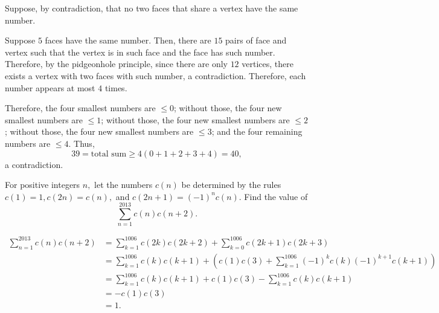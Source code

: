 \begin{sol}
	Suppose, by contradiction, that no two faces that share a vertex have the same number. 

	Suppose \(5\) faces have the same number. Then, there are \(15\) pairs of face and vertex such that the vertex is in such face and the face has such number. Therefore, by the pidgeonhole principle, since there are only \(12\) vertices, there exists a vertex with two faces with such number, a contradiction. Therefore, each number appears at most \(4\) times.

	Therefore, the four smallest numbers are \(\leq 0\);
	without those, the four new smallest numbers are \(\leq 1\);
	without those, the four new smallest numbers are \(\leq 2\);
	without those, the four new smallest numbers are \(\leq 3\);
	and the four remaining numbers are \(\leq 4\). Thus, \[
		39 = \text{total sum} \geq 4(0 + 1 + 2 + 3 + 4) = 40,
	\]
	a contradiction.
\end{sol}

\newpage
\begin{prob}[Putnam 2013, B1]
For positive integers $n,$ let the numbers $c(n)$ be determined by the rules $c(1)=1,c(2n)=c(n),$ and $c(2n+1)=(-1)^nc(n).$ Find the value of \[\sum_{n=1}^{2013}c(n)c(n+2).\]	
\end{prob}

\begin{sol}
	\begin{align*}
		\sum_{n=1}^{2013} c(n)c(n+2) &= \sum_{k=1}^{1006}c(2k)c(2k+2) + \sum_{k=0}^{1006}c(2k+1)c(2k+3) \\
									 &= \sum_{k=1}^{1006}c(k)c(k+1) + \left( c(1)c(3) + \sum_{k=1}^{1006}(-1)^{k}c(k)(-1)^{k+1}c(k+1)\right) \\ 
									 &= \sum_{k=1}^{1006}c(k)c(k+1) + c(1)c(3) - \sum_{k=1}^{1006}c(k)c(k+1) \\ 
									 &= -c(1)c(3)\\
									 &= 1.
	\end{align*}
\end{sol}
